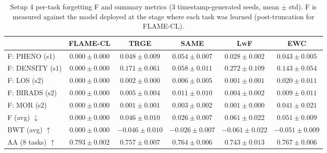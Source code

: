 \begin{table}[t]
\centering
\footnotesize
\setlength{\tabcolsep}{3pt}
\caption{Setup 4 per-task forgetting F and summary metrics (3 timestamp-generated seeds, mean $\pm$ std). F is measured against the model deployed at the stage where each task was learned (post-truncation for \textsc{FLAME-CL}).}
\label{tab:cl-setup4-forgetting}
\begin{tabular}{lccccc}
\toprule
 & \textsc{FLAME-CL} & TRGE & SAME & L\textsc{w}F & EWC \\
\midrule
F: PHENO (s1) & $0.000\pm0.000$ & $0.048\pm0.009$ & $0.054\pm0.007$ & $0.028\pm0.002$ & $0.043\pm0.005$ \\
F: DENSITY (s1) & $0.000\pm0.000$ & $0.171\pm0.061$ & $0.058\pm0.011$ & $0.272\pm0.109$ & $0.143\pm0.054$ \\
F: LOS (s2) & $0.000\pm0.000$ & $0.002\pm0.000$ & $0.006\pm0.005$ & $0.001\pm0.001$ & $0.020\pm0.011$ \\
F: BIRADS (s2) & $0.000\pm0.000$ & $0.005\pm0.004$ & $0.011\pm0.010$ & $0.004\pm0.002$ & $0.009\pm0.011$ \\
F: MOR (s2) & $0.000\pm0.000$ & $0.001\pm0.001$ & $0.003\pm0.002$ & $0.001\pm0.000$ & $0.041\pm0.021$ \\
\midrule
F (avg) $\downarrow$ & $0.000\pm0.000$ & $0.046\pm0.010$ & $0.026\pm0.007$ & $0.061\pm0.022$ & $0.051\pm0.009$ \\
BWT (avg) $\uparrow$ & $0.000\pm0.000$ & $-0.046\pm0.010$ & $-0.026\pm0.007$ & $-0.061\pm0.022$ & $-0.051\pm0.009$ \\
AA (8 tasks) $\uparrow$ & $0.793\pm0.002$ & $0.757\pm0.007$ & $0.764\pm0.006$ & $0.743\pm0.013$ & $0.767\pm0.006$ \\
\bottomrule
\end{tabular}
\end{table}
